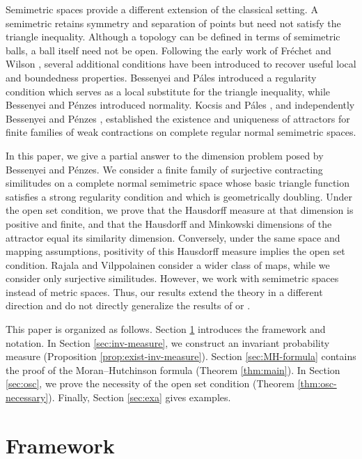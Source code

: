 \documentclass[a4paper, reqno, 11pt]{amsart}
\theoremstyle{definition}
\begin{document}
Semimetric spaces provide a different extension of the classical setting. 
A semimetric retains symmetry and separation of points but need not satisfy the triangle inequality. 
Although a topology can be defined in terms of semimetric balls, a ball itself need not be open. 
Following the early work of Fr\'echet \cite{Frechet1906} and Wilson \cite{Wilson1931}, 
several additional conditions have been introduced to recover useful local and boundedness properties. 
Bessenyei and P\'ales \cite{BessenyeiPales2017} introduced a regularity condition which serves as a local substitute for the triangle inequality, 
while Bessenyei and P\'enzes \cite{BessenyeiPenzes2022} introduced normality. 
Kocsis and P\'ales \cite{KocsisPales2022}, and independently Bessenyei and P\'enzes \cite{BessenyeiPenzes2022}, established the existence and uniqueness of attractors for finite families of weak contractions on complete regular normal semimetric spaces.

In this paper, we give a partial answer to the dimension problem posed by Bessenyei and P\'enzes. 
We consider a finite family of surjective contracting similitudes on a complete normal semimetric space whose basic triangle function satisfies a strong regularity condition and which is geometrically doubling. 
Under the open set condition, we prove that the Hausdorff measure at that dimension is positive and finite, and that the Hausdorff and Minkowski dimensions of the attractor equal its similarity dimension. 
Conversely, under the same space and mapping assumptions, positivity of this Hausdorff measure implies the open set condition.  
Rajala and Vilppolainen \cite{RajalaVilppolainen2011} consider a wider class of maps, while we consider only surjective similitudes. 
However, we work with semimetric spaces instead of metric spaces. 
Thus, our results extend the theory in a different direction and do not directly generalize the results of \cite{BaloghRohner2007} or \cite{RajalaVilppolainen2011}. 

This paper is organized as follows. 
Section \ref{sec:frame} introduces the framework and notation. 
In Section \ref{sec:inv-measure}, we construct an invariant probability measure (Proposition \ref{prop:exist-inv-measure}). 
Section \ref{sec:MH-formula} contains the proof of the Moran--Hutchinson formula (Theorem \ref{thm:main}). 
In Section \ref{sec:osc}, we prove the necessity of the open set condition (Theorem \ref{thm:osc-necessary}). 
Finally, Section \ref{sec:exa} gives examples.


\section{Framework}\label{sec:frame}
\end{document}
